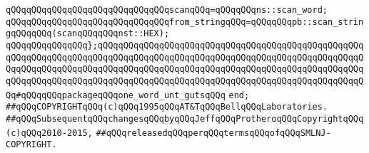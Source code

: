 \newline
\verb|qQQqqQQqqQQqqQQqqQQqqQQqqQQqqQQqscanqQQq=qQQqqQQqns::scan_word;|\newline
\newline
\verb|qQQqqQQqqQQqqQQqqQQqqQQqqQQqqQQqfrom_stringqQQq=qQQqqQQqpb::scan_stringqQQqqQQq(scanqQQqqQQqnst::HEX);|\newline
\verb|qQQqqQQqqQQqqQQq};qQQqqQQqqQQqqQQqqQQqqQQqqQQqqQQqqQQqqQQqqQQqqQQqqQQqqQQqqQQqqQQqqQQqqQQqqQQqqQQqqQQqqQQqqQQqqQQqqQQqqQQqqQQqqQQqqQQqqQQqqQQqqQQqqQQqqQQqqQQqqQQqqQQqqQQqqQQqqQQqqQQqqQQqqQQqqQQqqQQqqQQqqQQqqQQqqQQqqQQqqQQqqQQqqQQqqQQqqQQqqQQqqQQqqQQqqQQqqQQqqQQqqQQqqQQqqQQqqQQqqQQq#qQQqqQQqpackageqQQqone_word_unt_gutsqQQq|\newline
\verb|end;|\newline
\newline
\newline
\newline
\newline
\verb|##qQQqCOPYRIGHTqQQq(c)qQQq1995qQQqAT&TqQQqBellqQQqLaboratories.|\newline
\verb|##qQQqSubsequentqQQqchangesqQQqbyqQQqJeffqQQqProtheroqQQqCopyrightqQQq(c)qQQq2010-2015,|\newline
\verb|##qQQqreleasedqQQqperqQQqtermsqQQqofqQQqSMLNJ-COPYRIGHT.|\newline

